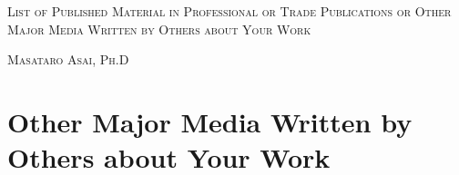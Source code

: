 


\pagestyle{empty}

\begin{center}
{\huge\textsc{List of Published Material in Professional or Trade Publications or Other Major Media Written by Others about Your Work}}
\vspace{0.7\baselineskip}

{\Large\textsc{Masataro Asai, Ph.D}}
\vspace{0.5\baselineskip}

\small

\end{center}

\section{Other Major Media Written by Others about Your Work}

\nocite{nikkei}
\putbib





